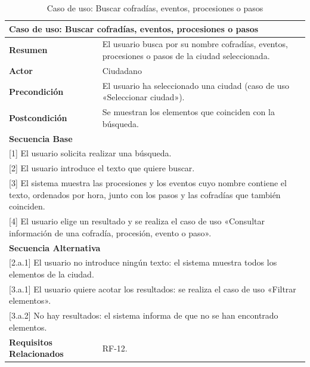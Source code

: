 \begin{table}[h!]
    \centering
    \renewcommand{\arraystretch}{1.5}

    \begin{tabular}{|p{4cm}|p{11cm}|}
        \hline
        \multicolumn{2}{|l|}{\textbf{Caso de uso: Buscar cofradías, eventos, procesiones o pasos}} \\
        \hline
        \textbf{Resumen} & El usuario busca por su nombre cofradías, eventos, procesiones o pasos de la ciudad seleccionada. \\
        \hline
        \textbf{Actor} & Ciudadano \\
        \hline
        \textbf{Precondición} & El usuario ha seleccionado una ciudad (caso de uso «Seleccionar ciudad»). \\
        \hline
        \textbf{Postcondición} & Se muestran los elementos que coinciden con la búsqueda. \\
        \hline
        \multicolumn{2}{|l|}{\textbf{Secuencia Base}} \\
        \hline
        \multicolumn{2}{|p{15cm}|}{ [1] El usuario solicita realizar una búsqueda. } \\
        \hline
        \multicolumn{2}{|p{15cm}|}{ [2] El usuario introduce el texto que quiere buscar. } \\
        \hline
        \multicolumn{2}{|p{15cm}|}{ [3] El sistema muestra las procesiones y los eventos cuyo nombre contiene el texto, ordenados por hora, junto con los pasos y las cofradías que también coinciden. } \\
        \hline
        \multicolumn{2}{|p{15cm}|}{ [4] El usuario elige un resultado y se realiza el caso de uso «Consultar información de una cofradía, procesión, evento o paso». } \\
        \hline
        \multicolumn{2}{|l|}{\textbf{Secuencia Alternativa}} \\
        \hline
        \multicolumn{2}{|p{15cm}|}{ [2.a.1] El usuario no introduce ningún texto: el sistema muestra todos los elementos de la ciudad. } \\
        \hline
        \multicolumn{2}{|p{15cm}|}{ [3.a.1] El usuario quiere acotar los resultados: se realiza el caso de uso «Filtrar elementos». } \\
        \hline
        \multicolumn{2}{|p{15cm}|}{ [3.a.2] No hay resultados: el sistema informa de que no se han encontrado elementos. } \\
        \hline
        \textbf{Requisitos Relacionados} & RF-12. \\
        \hline
    \end{tabular}
    \caption{Caso de uso: Buscar cofradías, eventos, procesiones o pasos}
\end{table}

